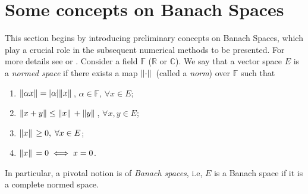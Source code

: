\label{chap:Preliminaries}
\section{Some concepts on Banach Spaces}
This section begins by introducing preliminary concepts on Banach Spaces, which play a crucial role in the subsequent numerical methods to be presented. For more details see \cite{rudin1991functional} or \cite{brezis2011functional}. Consider a field \(\mathbb{F}\) (\(\mathbb{R}\) or \(\mathbb{C}\)). We say that a vector space \(E\) is a \textit{normed space} if there exists a map \(\norm*{\cdot}\) (called a \textit{norm}) over \(\mathbb{F}\) such that
\begin{enumerate}
    \item \(\norm{\alpha x}= \abs{\alpha}\norm*{x}\), \(\alpha \in \mathbb{F}\), \(\forall x \in E\);
    \item \(\norm{x + y} \leq \norm*{x} + \norm*{y}\), \(\forall x, y \in E\);
    \item \(\norm*{x} \geq 0, \; \forall x \in E\);
    \item \(\norm*{x} = 0 \iff x=0\).
\end{enumerate}
In particular, a pivotal notion is of \textit{Banach spaces}, i.e, \(E\) is a Banach space if it is a complete normed space.
